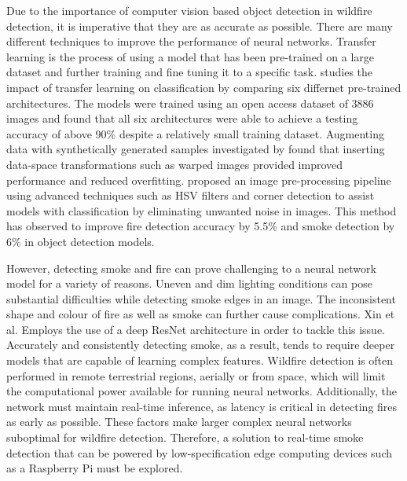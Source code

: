 \documentclass[lettersize,journal]{IEEEtran}
\begin{document}
Due to the importance of computer vision based object detection in
wildfire detection, it is imperative that they are as accurate as
possible. There are many different techniques to improve the performance
of neural networks. Transfer learning is the process of using a model
that has been pre-trained on a large dataset and further training and
fine tuning it to a specific task. \cite{transferlearning} studies the
impact of transfer learning on classification by comparing six differnet
pre-trained architectures. The models were trained using an open access
dataset of 3886 images and found that all six architectures were able to
achieve a testing accuracy of above 90\% despite a relatively small
training dataset. Augmenting data with synthetically generated samples
investigated by \cite{augment} found that inserting data-space
transformations such as warped images provided improved performance and
reduced overfitting. \cite{prepfire} proposed an image pre-processing
pipeline using advanced techniques such as HSV filters and corner
detection to assist models with classification by eliminating unwanted
noise in images. This method has observed to improve fire detection
accuracy by 5.5\% and smoke detection by 6\% in object detection models.

However, detecting smoke and fire can prove challenging to a neural network model for a variety of reasons.
Uneven and dim lighting conditions can pose substantial difficulties while detecting smoke edges in an image.
The inconsistent shape and colour of fire as well as smoke can further cause complications.
Xin et al. \cite{resnetsmoke} Employs the use of a deep ResNet architecture in order to tackle this issue.
Accurately and consistently detecting smoke, as a result, tends to require deeper models that are capable of learning complex features.
Wildfire detection is often performed in remote terrestrial regions, aerially or from space, which will limit the computational power available for running neural networks.
Additionally, the network must maintain real-time inference, as latency is critical in detecting fires as early as possible.
These factors make larger complex neural networks suboptimal for wildfire detection.
Therefore, a solution to real-time smoke detection that can be powered by low-specification edge computing devices such as a Raspberry Pi must be explored.
\end{document}
